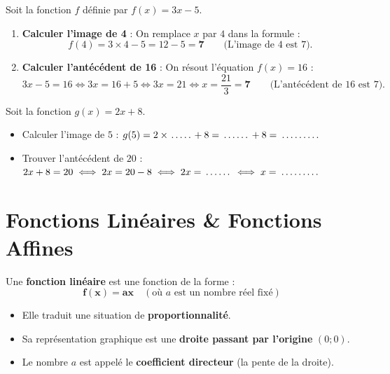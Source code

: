 \begin{cadremethode}
Soit la fonction $f$ définie par $f(x) = 3x - 5$.
\begin{enumerate}[leftmargin=1.5em, itemsep=2pt]
    \item \textbf{Calculer l'image de 4} : On remplace $x$ par $4$ dans la formule :
    \[ f(4) = 3 \times 4 - 5 = 12 - 5 = \mathbf{7} \qquad \text{(L'image de $4$ est $7$)}. \]
    \item \textbf{Calculer l'antécédent de 16} : On résout l'équation $f(x) = 16$ :
    \[ 3x - 5 = 16 \iff 3x = 16 + 5 \iff 3x = 21 \iff x = \frac{21}{3} = \mathbf{7} \qquad \text{(L'antécédent de $16$ est $7$)}. \]
\end{enumerate}
\end{cadremethode}

\begin{cadreexemple}
Soit la fonction $g(x) = 2x + 8$.
\begin{itemize}[leftmargin=1.5em, itemsep=2pt]
    \item Calculer l'image de $5$ : $g(5) = 2 \times \pointille[0.8cm] + 8 = \pointille[1cm] + 8 = \pointille[1.5cm]$
    \item Trouver l'antécédent de $20$ : $2x + 8 = 20 \iff 2x = 20 - 8 \iff 2x = \pointille[1cm] \iff x = \pointille[1.5cm]$
\end{itemize}
\end{cadreexemple}

\section{Fonctions Linéaires \& Fonctions Affines}

\begin{cadredef}
Une \textbf{fonction linéaire} est une fonction de la forme :
\[ \mathbf{f(x) = ax} \quad (\text{où } a \text{ est un nombre réel fixé}) \]
\begin{itemize}[leftmargin=1.5em, itemsep=2pt]
    \item Elle traduit une situation de \textbf{proportionnalité}.
    \item Sa représentation graphique est une \textbf{droite passant par l'origine} $(0;0)$.
    \item Le nombre $a$ est appelé le \textbf{coefficient directeur} (la pente de la droite).
\end{itemize}
\end{cadredef}

